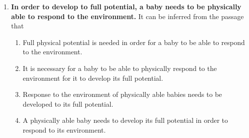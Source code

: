 \documentclass[journal,12pt,onecolumn]{IEEEtran}
\theoremstyle{remark}
\begin{document}
\begin{enumerate}[resume]
\item \textbf{In order to develop to full potential, a baby needs to be physically able to respond to the environment.}  
It can be inferred from the passage that  
\begin{enumerate}
\item Full physical potential is needed in order for a baby to be able to respond to the environment.  
\item It is necessary for a baby to be able to physically respond to the environment for it to develop its full potential.  
\item Response to the environment of physically able babies needs to be developed to its full potential.  
\item A physically able baby needs to develop its full potential in order to respond to its environment.  
\end{enumerate}

\end{enumerate}
\end{document}
